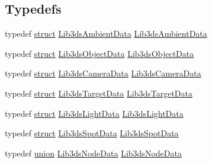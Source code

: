 \subsection*{Typedefs}
\begin{DoxyCompactItemize}
\item 
typedef \hyperlink{sdlgamepad_8dox_aba655c5729da86df745f0c8e7f9ba8d2}{struct} \hyperlink{struct_lib3ds_ambient_data}{Lib3ds\-Ambient\-Data} \hyperlink{group__node_ga0d4a868adad3cf3cb561467289bbbce9}{Lib3ds\-Ambient\-Data}
\item 
typedef \hyperlink{sdlgamepad_8dox_aba655c5729da86df745f0c8e7f9ba8d2}{struct} \hyperlink{struct_lib3ds_object_data}{Lib3ds\-Object\-Data} \hyperlink{group__node_ga85a4ac26f142af0fcb16d6848076c3c1}{Lib3ds\-Object\-Data}
\item 
typedef \hyperlink{sdlgamepad_8dox_aba655c5729da86df745f0c8e7f9ba8d2}{struct} \hyperlink{struct_lib3ds_camera_data}{Lib3ds\-Camera\-Data} \hyperlink{group__node_gaeb1879e7cbea3578f93707d1aff7bf84}{Lib3ds\-Camera\-Data}
\item 
typedef \hyperlink{sdlgamepad_8dox_aba655c5729da86df745f0c8e7f9ba8d2}{struct} \hyperlink{struct_lib3ds_target_data}{Lib3ds\-Target\-Data} \hyperlink{group__node_ga153f5447adef21a31250d5074635a14a}{Lib3ds\-Target\-Data}
\item 
typedef \hyperlink{sdlgamepad_8dox_aba655c5729da86df745f0c8e7f9ba8d2}{struct} \hyperlink{struct_lib3ds_light_data}{Lib3ds\-Light\-Data} \hyperlink{group__node_gafa635d55f560f9124cb51e9326d9aa0b}{Lib3ds\-Light\-Data}
\item 
typedef \hyperlink{sdlgamepad_8dox_aba655c5729da86df745f0c8e7f9ba8d2}{struct} \hyperlink{struct_lib3ds_spot_data}{Lib3ds\-Spot\-Data} \hyperlink{group__node_ga8d907993bc5aa338f5d85c0495e867c8}{Lib3ds\-Spot\-Data}
\item 
typedef \hyperlink{sdlgamepad_8dox_a68000add3c95d09ceb97c3079515907d}{union} \hyperlink{union_lib3ds_node_data}{Lib3ds\-Node\-Data} \hyperlink{group__node_ga1eab7eee2c1297ea7f5491872dff9fd3}{Lib3ds\-Node\-Data}
\end{DoxyCompactItemize}
